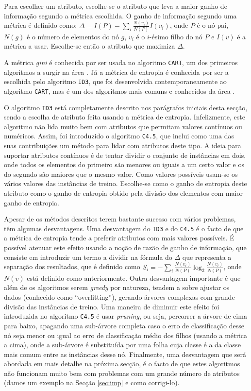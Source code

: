 \documentclass[12pt,a4paper,oneside]{article}
\begin{document}
Para escolher um atributo, escolhe-se o atributo que leva a maior
ganho de informação segundo a métrica escolhida. O ganho de informação
segundo uma métrica é definido como: $\Delta = I(P) -
\sum_i{\frac{N(v_i)}{N(P)} I(v_i)}$, onde $P$ é o nó pai, $N(g)$ é o
número de elementos do nó $g$, $v_i$ é o $i$-ésimo filho do nó $P$ e
$I(v)$ é a métrica a usar. Escolhe-se então o atributo que maximiza
$\Delta$.

A métrica \textit{gini} é conhecida por ser usada no algoritmo
\texttt{CART}, um dos primeiros algoritmos a surgir na área
\cite{tien:1985}. Já a métrica de entropia é conhecida por ser a
escolhida pelo algoritmo \texttt{ID3}, que foi desenvolvida
contemporaneamente ao algoritmo \texttt{CART}, mas é um dos algoritmos
mais comuns e conhecidos da área \cite{quinlan:1986}.

O algoritmo \texttt{ID3} está completamente descrito nos parágrafos
iniciais desta secção, sendo a escolha de atributo feita usando a
métrica de entropia. Infelizmente, este algoritmo não lida muito bem
com atributos que permitam valores contínuos ou numéricos. Assim, foi
introduzido o algoritmo \texttt{C4.5}, que inclui como uma das suas
contribuições um método para lidar com atributos deste tipo. A ideia
para suportar atributos contínuos é de tentar dividir o conjunto de
instâncias em dois, onde todos os elementos do primeiro são menores ou
iguais a um certo valor e os do segundo são maiores que o mesmo
valor. Como valores possíveis usam-se os vários valores das instâncias
de treino. Escolhe-se como o ganho de entropia deste atributo como o
ganho de entropia obtido pela divisão dos elementos com maior ganho de
entropia.

Apesar de os métodos descritos terem bastante sucesso com vários
problemas, têm algumas desvantagens. Uma desvantagem do \texttt{ID3} e
do \texttt{C4.5} é o facto de que a métrica de entropia tende a
preferir atributos com mais valores possíveis. É possível atenuar este
efeito usando a noção de razão de ganho de informação, que consiste em
introduzir um termo a dividir na fórmula do $\Delta$ que representa a
separação dos resultados, que é definido como $S_i =
-\sum_i{\frac{N(v_i)}{N(P)} \log_2{\frac{N(v_i)}{N(P)}}}$, onde $N(v)$
está definido como anteriormente. Outra desvantagem importante é que
além de os algoritmos serem \textit{greedy} por natureza, tendem a
sobre ajustar os dados (conhecido como ``overfitting''), gerando
árvores complexas com grande divisão das instâncias de treino. Uma
maneira de diminuir este efeito foi introduzida no algoritmo
\texttt{C4.5} é usar \textit{pruning}, ou seja, percorrer a árvore de
cima para baixo, apagando uma sub-árvore completa caso o erro de
classificação desse nó seja menor ou igual ao erro de classificação
médio dos filhos (usando a métrica a cima), onde a sub-árvore é
substituída por uma folha cuja classe é a da classe mais comum entre
as instâncias desse nó. Finalmente, uma desvantagem que será abordada
em mais detalhe na próxima secção, é o facto de que estes algoritmos
não funcionam muito bem com problemas com um grande número de
atributos (damos um exemplo na Secção \ref{sec:imp} e como
corrigi-lo).
\end{document}
